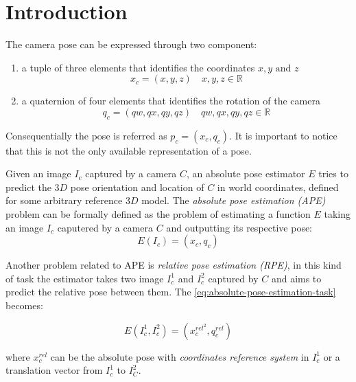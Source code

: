 \section{Introduction}
The camera pose can be expressed through two component:
\begin{enumerate}
    \item a tuple of three elements that identifies the coordinates $x,y\text{ and }z$
    \begin{equation}
        x_c=(x,y,z)\quad x,y,z \in \mathbb{R}  
        \label{eq:absolute-position-definition}
    \end{equation}
    \item a quaternion of four elements that identifies the rotation of the camera
    \begin{equation}
        q_c=(qw, qx, qy, qz)\quad qw,qx,qy,qz \in \mathbb{R}
        \label{eq:quaternion-as-rotation-definition}
    \end{equation}

\end{enumerate}
Consequentially the pose is referred as $p_c=(x_c, q_c)$. It is important to notice that this is not the only available representation of a pose.

Given an image $I_c$ captured by a camera $C$, an absolute pose estimator $E$ tries to predict the $3D$ pose orientation and location of $C$ in world coordinates, defined for some arbitrary reference $3D$ model. The \textit{absolute pose estimation (APE)} problem can be formally defined as the problem of estimating a function $E$ taking an image $I_c$ caputered by a camera $C$ and outputting its respective pose:
\begin{equation}
    E(I_c) = (x_c, q_c)
    \label{eq:absolute-pose-estimation-task}
\end{equation}

Another problem related to APE is \textit{relative pose estimation (RPE)}, in this kind of task the estimator takes two image $I_c^1$ and $I_c^2$ captured by $C$ and aims to predict the relative pose between them. The \cref{eq:absolute-pose-estimation-task} becomes:

\begin{equation}
    E(I_c^1, I_c^2) = (x_c^{rel^2}, q_c^{rel})
    \label{eq:relative-pose-estimation-task}
\end{equation}

where $x_c^{rel}$ can be the absolute pose with \textit{coordinates reference system} in $I_c^1$ or a translation vector from $I_c^1$ to $I_C^2$.
